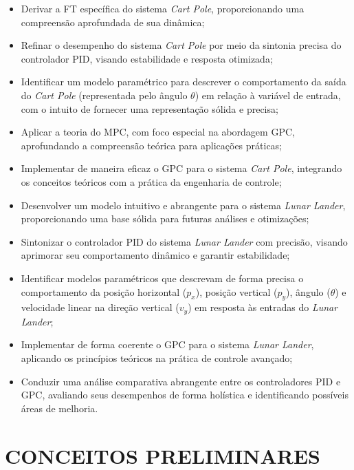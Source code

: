 \documentclass[12pt,           %
a4paper,                       %
openany,                       %
oneside,                       %
chapter=TITLE,                 %
english,                       %
spanish,                       %
brazil,                        %
sumario=tradicional]{abntex2}  %
\begin{document}
\begin{OnehalfSpace}
\begin{itemize}[itemsep=0.5em] %
    \item Derivar a FT específica do sistema \textit{Cart Pole}, proporcionando uma compreensão aprofundada de sua dinâmica;
    \item Refinar o desempenho do sistema \textit{Cart Pole} por meio da sintonia precisa do controlador PID, visando estabilidade e resposta otimizada;
    \item Identificar um modelo paramétrico para descrever o comportamento da saída do \textit{Cart Pole} (representada pelo ângulo $\theta$) em relação à variável de entrada, com o intuito de fornecer uma representação sólida e precisa;
    \item Aplicar a teoria do MPC, com foco especial na abordagem GPC, aprofundando a compreensão teórica para aplicações práticas;
    \item Implementar de maneira eficaz o GPC para o sistema \textit{Cart Pole}, integrando os conceitos teóricos com a prática da engenharia de controle;
    \item Desenvolver um modelo intuitivo e abrangente para o sistema \textit{Lunar Lander}, proporcionando uma base sólida para futuras análises e otimizações;
    \item Sintonizar o controlador PID do sistema \textit{Lunar Lander} com precisão, visando aprimorar seu comportamento dinâmico e garantir estabilidade;
	\item Identificar modelos paramétricos que descrevam de forma precisa o comportamento da posição horizontal ($p_x$), posição vertical ($p_y$), ângulo ($\theta$) e velocidade linear na direção vertical ($v_y$) em resposta às entradas do \textit{Lunar Lander};
    \item Implementar de forma coerente o GPC para o sistema \textit{Lunar Lander}, aplicando os princípios teóricos na prática de controle avançado;
    \item Conduzir uma análise comparativa abrangente entre os controladores PID e GPC, avaliando seus desempenhos de forma holística e identificando possíveis áreas de melhoria.
\end{itemize}


{\let\clearpage\relax\par \chapter{CONCEITOS PRELIMINARES}}  %
\label{ch:conceitosPreliminares}           %
																		

\end{OnehalfSpace}
\end{document}
